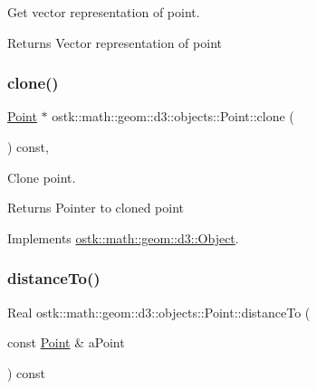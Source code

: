 Get vector representation of point. 

\begin{DoxyReturn}{Returns}
Vector representation of point 
\end{DoxyReturn}
\mbox{\label{classostk_1_1math_1_1geom_1_1d3_1_1objects_1_1_point_aeee85a494568471d821310dc14b5b9d5}} 
\subsubsection{\texorpdfstring{clone()}{clone()}}
{\footnotesize\ttfamily \hyperlink{classostk_1_1math_1_1geom_1_1d3_1_1objects_1_1_point}{Point} $\ast$ ostk\+::math\+::geom\+::d3\+::objects\+::\+Point\+::clone (\begin{DoxyParamCaption}{ }\end{DoxyParamCaption}) const\hspace{0.3cm}{\ttfamily [override]}, {\ttfamily [virtual]}}



Clone point. 

\begin{DoxyReturn}{Returns}
Pointer to cloned point 
\end{DoxyReturn}


Implements \hyperlink{classostk_1_1math_1_1geom_1_1d3_1_1_object_a676013f9555f6492687f9809b2db887b}{ostk\+::math\+::geom\+::d3\+::\+Object}.

\mbox{\label{classostk_1_1math_1_1geom_1_1d3_1_1objects_1_1_point_a17c835ac01d24fb703eee44191331ee7}} 
\subsubsection{\texorpdfstring{distance\+To()}{distanceTo()}}
{\footnotesize\ttfamily Real ostk\+::math\+::geom\+::d3\+::objects\+::\+Point\+::distance\+To (\begin{DoxyParamCaption}\item[{const \hyperlink{classostk_1_1math_1_1geom_1_1d3_1_1objects_1_1_point}{Point} \&}]{a\+Point }\end{DoxyParamCaption}) const}



